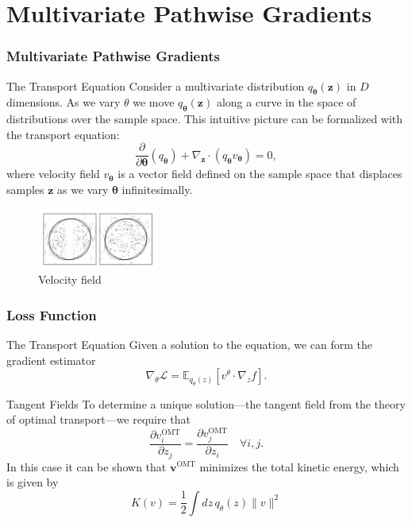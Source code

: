\documentclass{beamer}
\begin{document}
\section{Multivariate Pathwise Gradients}
\begin{frame}
    \frametitle{ Multivariate Pathwise Gradients}
    \begin{block}{The Transport Equation}
    Consider a multivariate distribution $q_\mathbf{\theta}(\mathbf{z})$ in $D$ dimensions. As we vary $\theta$ we move $q_\mathbf{\theta}(\mathbf{z})$ along a
curve in the space of distributions over the sample space. This intuitive picture can be formalized with the
transport equation:
$$\frac{\partial}{\partial \mathbf{\theta}} (q_{\mathbf{\theta}}) + \nabla_\mathbf{z} \cdot (q_{\mathbf{\theta}} v_{\mathbf{\theta}}) = 0,$$
where velocity field $v_\mathbf{\theta}$ is a vector field defined on the sample space that displaces samples $\mathbf{z}$ as we
vary $\mathbf{\theta}$ infinitesimally.
    \end{block}

    \begin{figure}[h!]
      \centering
      \includegraphics[width=0.35\textwidth]{figures/velocity.png}
      \caption{Velocity field}
      \label{fig:velocity}
    \end{figure}

\end{frame}

\begin{frame}
    \frametitle{Loss Function}
    \begin{block}{The Transport Equation}
    Given a solution to the equation, we can form the gradient estimator 
    $$\nabla_{\theta} \mathcal{L} = \mathbb{E}_{q_{\theta}(z)} \left[ v^{\theta} \cdot \nabla_{z} f \right].$$
    \end{block}

    \begin{block}{Tangent Fields}
    To determine a unique solution—the tangent field from the theory of optimal transport—we require that
    $$\frac{\partial v_i^{\text{OMT}}}{\partial z_j} = \frac{\partial v_j^{\text{OMT}}}{\partial z_i} \quad \forall i, j.$$
    In this case it can be shown that $\mathbf{v}^\text{OMT}$ minimizes the total kinetic energy, which is given by
    $$K(v) = \frac{1}{2} \int dz \, q_{\theta}(z) \|v\|^2 $$
    \end{block}

\end{frame}
\end{document}
